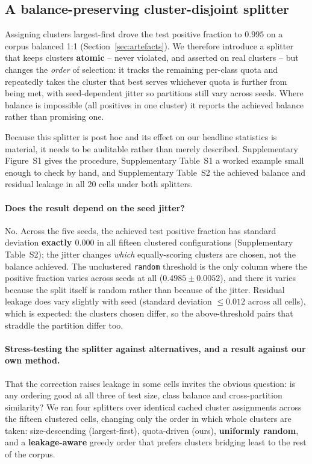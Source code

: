 \documentclass[11pt,a4paper]{article}
\begin{document}
\subsection{A balance-preserving cluster-disjoint splitter}
\label{sec:balanced}

Assigning clusters largest-first drove the test positive fraction to $0.995$ on a corpus
balanced 1:1 (Section~\ref{sec:artefacts}). We therefore introduce a splitter that keeps
clusters \textbf{atomic} -- never violated, and asserted on real clusters -- but changes
the \emph{order} of selection: it tracks the remaining per-class quota and repeatedly takes
the cluster that best serves whichever quota is further from being met, with seed-dependent
jitter so partitions still vary across seeds. Where balance is impossible (all positives in
one cluster) it reports the achieved balance rather than promising one.

Because this splitter is post hoc and its effect on our headline statistics is material, it
needs to be auditable rather than merely described. Supplementary Figure~S1 gives the
procedure, Supplementary Table~S1 a worked example small enough to check by hand, and
Supplementary Table~S2 the achieved balance and residual leakage in all 20 cells
under both splitters.


\paragraph{Does the result depend on the seed jitter?} No. Across the five seeds, the
achieved test positive fraction has standard deviation \textbf{exactly $0.000$} in all
fifteen clustered configurations (Supplementary Table~S2); the jitter changes
\emph{which} equally-scoring clusters are chosen, not the balance achieved. The unclustered
\texttt{random} threshold is the only column where the positive fraction varies across
seeds at all ($0.4985 \pm 0.0052$), and there it varies because the split itself is random
rather than because of the jitter. Residual leakage does vary slightly with seed (standard
deviation $\leq 0.012$ across all cells), which is expected: the clusters chosen differ, so
the above-threshold pairs that straddle the partition differ too.


\paragraph{Stress-testing the splitter against alternatives, and a result against our own
method.} That the correction raises leakage in some cells invites the obvious question: is
any ordering good at all three of test size, class balance and cross-partition similarity?
We ran four splitters over identical cached cluster assignments across the fifteen clustered
cells, changing only the order in which whole clusters are taken: size-descending
(largest-first), quota-driven (ours), \textbf{uniformly random}, and a
\textbf{leakage-aware} greedy order that prefers clusters bridging least to the rest of the
corpus.
\end{document}
